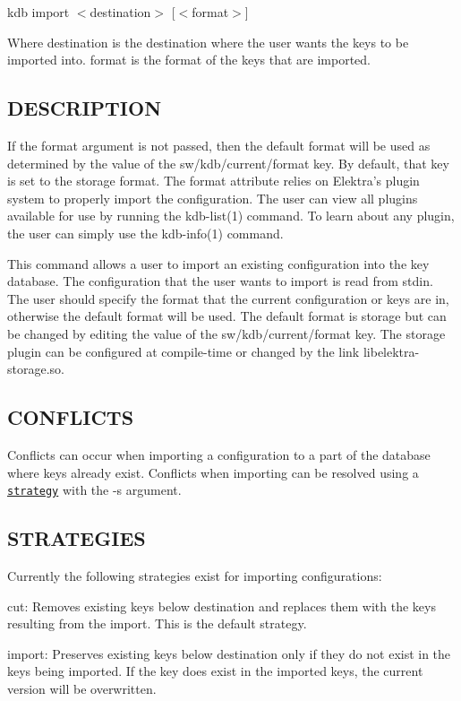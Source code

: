 {\ttfamily kdb import $<$destination$>$ \mbox{[}$<$format$>$\mbox{]}}

Where {\ttfamily destination} is the destination where the user wants the keys to be imported into. {\ttfamily format} is the format of the keys that are imported.

\subsection*{D\+E\+S\+C\+R\+I\+P\+T\+I\+O\+N}

If the {\ttfamily format} argument is not passed, then the default format will be used as determined by the value of the {\ttfamily sw/kdb/current/format} key. By default, that key is set to the {\ttfamily storage} format. The {\ttfamily format} attribute relies on Elektra's plugin system to properly import the configuration. The user can view all plugins available for use by running the kdb-\/list(1) command. To learn about any plugin, the user can simply use the kdb-\/info(1) command.

This command allows a user to import an existing configuration into the key database. The configuration that the user wants to import is read from {\ttfamily stdin}. The user should specify the format that the current configuration or keys are in, otherwise the default format will be used. The default format is {\ttfamily storage} but can be changed by editing the value of the {\ttfamily sw/kdb/current/format} key. The {\ttfamily storage} plugin can be configured at compile-\/time or changed by the link {\ttfamily libelektra-\/storage.\+so}.

\subsection*{C\+O\+N\+F\+L\+I\+C\+T\+S}

Conflicts can occur when importing a configuration to a part of the database where keys already exist. Conflicts when importing can be resolved using a \href{#STRATEGIES}{\tt strategy} with the {\ttfamily -\/s} argument.

\subsection*{S\+T\+R\+A\+T\+E\+G\+I\+E\+S}

Currently the following strategies exist for importing configurations\+:


\begin{DoxyItemize}
\item {\ttfamily cut}\+: Removes existing keys below {\ttfamily destination} and replaces them with the keys resulting from the import. This is the default strategy.
\item {\ttfamily import}\+: Preserves existing keys below {\ttfamily destination} only if they do not exist in the keys being imported. If the key does exist in the imported keys, the current version will be overwritten.
\end{DoxyItemize}


